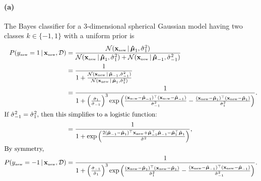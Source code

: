 \documentclass[a4paper,11pt]{article}
\DeclareMathOperator{\given}{\mid}
\begin{document}
\paragraph{(a)}
The Bayes classifier for a 3-dimensional spherical Gaussian model having two classes $k\in\{-1,1\}$ with a uniform prior is
\begin{align*}
  P( y_\mathrm{\scriptscriptstyle{new}}=1
    \given \mathbf{x}_\mathrm{\scriptscriptstyle{new}}, \mathcal{D})
  &=
  \frac{
    \mathcal{N}( \mathbf{x}_\mathrm{\scriptscriptstyle{new}}
      \given \boldsymbol{\hat\mu}_1, \hat\sigma_1^2)
  }{
    \mathcal{N}( \mathbf{x}_\mathrm{\scriptscriptstyle{new}}
      \given \boldsymbol{\hat\mu}_1, \hat\sigma_1^2)
    +
    \mathcal{N}( \mathbf{x}_\mathrm{\scriptscriptstyle{new}}
      \given \boldsymbol{\hat\mu}_{-1}, \hat\sigma_{-1}^2)
  }
  \\
  &=
  \frac{1}{
    1 + \frac{
      \mathcal{N}( \mathbf{x}_\mathrm{\scriptscriptstyle{new}}
        \given \boldsymbol{\hat\mu}_{-1}, \hat\sigma_{-1}^2)
    }{
      \mathcal{N}( \mathbf{x}_\mathrm{\scriptscriptstyle{new}}
        \given \boldsymbol{\hat\mu}_1, \hat\sigma_1^2)
    }
  }
  \\
  &=
  \frac{1}{
    1 + \left(\frac{
    \hat\sigma_1
    }{
    \hat\sigma_{-1}
    }\right)^3
    \exp\left(
      \frac{
        (\mathbf{x}_\mathrm{\scriptscriptstyle{new}}-\boldsymbol{\hat\mu}_{-1})^\top
        (\mathbf{x}_\mathrm{\scriptscriptstyle{new}}-\boldsymbol{\hat\mu}_{-1})
      }{\hat\sigma_{-1}^2}
      -\frac{
        (\mathbf{x}_\mathrm{\scriptscriptstyle{new}}-\boldsymbol{\hat\mu}_{1})^\top
        (\mathbf{x}_\mathrm{\scriptscriptstyle{new}}-\boldsymbol{\hat\mu}_{1})
      }{\hat\sigma_{1}^2}
    \right)
  }.
  \\
\intertext{If $\hat\sigma_{-1}^2=\hat\sigma_{1}^2$, then this simplifies to a logistic function:}
  &=
  \frac{1}{
    1 + \exp\left(
      \frac{
        2(\boldsymbol{\hat\mu}_{-1}-\boldsymbol{\hat\mu}_1)^\top\mathbf{x}_\mathrm{\scriptscriptstyle{new}}
        + \boldsymbol{\hat\mu}_{-1}^\top\boldsymbol{\hat\mu}_{-1}
        - \boldsymbol{\hat\mu}_{1}^\top\boldsymbol{\hat\mu}_{1}
      }{\hat\sigma^2}
    \right)
  },
  \\
\intertext{By symmetry,}
  P( y_\mathrm{\scriptscriptstyle{new}}=-1
    \given \mathbf{x}_\mathrm{\scriptscriptstyle{new}}, \mathcal{D})
  &=
  \frac{1}{
    1 + \left(\frac{
      \hat\sigma_{-1}
    }{
      \hat\sigma_{1}
    }\right)^3
  \exp\left(
    \frac{
      (\mathbf{x}_\mathrm{\scriptscriptstyle{new}}-\boldsymbol{\hat\mu}_{1})^\top
      (\mathbf{x}_\mathrm{\scriptscriptstyle{new}}-\boldsymbol{\hat\mu}_{1})
    }{\hat\sigma_{1}^2}
    -\frac{
      (\mathbf{x}_\mathrm{\scriptscriptstyle{new}}-\boldsymbol{\hat\mu}_{-1})^\top
      (\mathbf{x}_\mathrm{\scriptscriptstyle{new}}-\boldsymbol{\hat\mu}_{-1})
    }{\hat\sigma_{-1}^2}
  \right)
}.
\end{align*}
\end{document}
